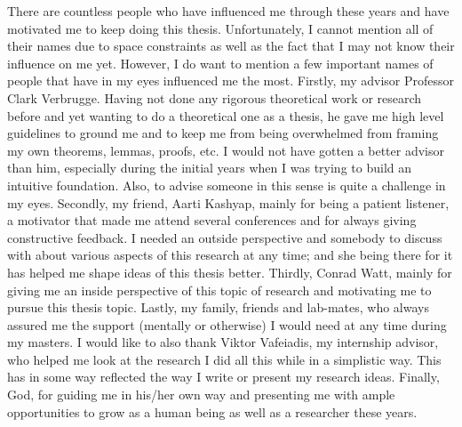 There are countless people who have influenced me through these years and have motivated me to keep doing this thesis.
Unfortunately, I cannot mention all of their names due to space constraints as well as the fact that I may not know their influence on me yet.
However, I do want to mention a few important names of people that have in my eyes influenced me the most. 
Firstly, my advisor Professor Clark Verbrugge.
Having not done any rigorous theoretical work or research before and yet wanting to do a theoretical one as a thesis, he gave me high level guidelines to ground me and to keep me from being overwhelmed from framing my own theorems, lemmas, proofs, etc. 
I would not have gotten a better advisor than him, especially during the initial years when I was trying to build an intuitive foundation. 
Also, to advise someone in this sense is quite a challenge in my eyes.
Secondly, my friend, Aarti Kashyap, mainly for being a patient listener, a motivator that made me attend several conferences and for always giving constructive feedback. 
I needed an outside perspective and somebody to discuss with about various aspects of this research at any time; and she being there for it has helped me shape ideas of this thesis better. 
Thirdly, Conrad Watt, mainly for giving me an inside perspective of this topic of research and motivating me to pursue this thesis topic.
Lastly, my family, friends and lab-mates, who always assured me the support (mentally or otherwise) I would need at any time during my masters. 
I would like to also thank Viktor Vafeiadis, my internship advisor, who helped me look at the research I did all this while in a simplistic way.
This has in some way reflected the way I write or present my research ideas.
Finally, God, for guiding me in his/her own way and presenting me with ample opportunities to grow as a human being as well as a researcher these years.